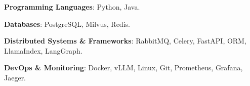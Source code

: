 \begin{cvempty} %
    \begin{cvitems} %
        \item{\textbf{Programming Languages}: Python, Java.}
        \item{\textbf{Databases}: PostgreSQL, Milvus, Redis.}
        \item{\textbf{Distributed Systems \& Frameworks}: RabbitMQ, Celery, FastAPI, ORM, LlamaIndex, LangGraph.}
        \item{\textbf{DevOps \& Monitoring}: Docker, vLLM, Linux, Git, Prometheus, Grafana, Jaeger.}
    \end{cvitems}
\end{cvempty}
